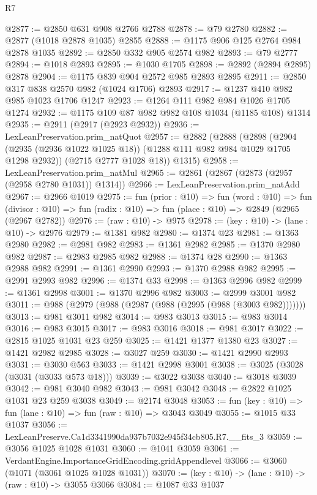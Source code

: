 \begin{lexlean}{R7}
\begin{coremodule}
@2877 := @2850 @631 @908 @2766 @2788
@2878 := @79 @2780
@2882 := @2877 (@1018 @2878 @1035) @2855
@2888 := @1175 @906 @125 @2764 @984 @2878 @1035
@2892 := @2850 @332 @905 @2574 @982
@2893 := @79 @2777
@2894 := @1018 @2893
@2895 := @1030 @1705
@2898 := @2892 (@2894 @2895) @2878
@2904 := @1175 @839 @904 @2572 @985 @2893 @2895
@2911 := @2850 @317 @838 @2570 @982 (@1024 @1706) @2893
@2917 := @1237 @410 @982 @985 @1023 @1706 @1247
@2923 := @1264 @111 @982 @984 @1026 @1705 @1274
@2932 := @1175 @109 @87 @982 @982 @108 @1034 (@1185 @108) @1314
@2935 := @2911 (@2917 (@2923 @2932))
@2936 := LexLeanPreservation.prim_natQuot
@2957 := @2882
    (@2888
      (@2898
        (@2904 (@2935 (@2936 @1022 @1025 @18)) (@1288 @111 @982 @984 @1029 @1705 @1298 @2932))
        (@2715 @2777 @1028 @18))
      @1315)
@2958 := LexLeanPreservation.prim_natMul
@2965 := @2861 (@2867 (@2873 (@2957 (@2958 @2780 @1031)) @1314))
@2966 := LexLeanPreservation.prim_natAdd
@2967 := @2966 @1019
@2975 := fun (prior : @10) =>
  fun (word : @10) =>
  fun (divisor : @10) => fun (radix : @10) => fun (place : @10) => @2849 (@2965 (@2967 @2782))
@2976 := (raw : @10) -> @975
@2978 := (key : @10) -> (lane : @10) -> @2976
@2979 := @1381 @982
@2980 := @1374 @23
@2981 := @1363 @2980
@2982 := @2981 @982
@2983 := @1361 @2982
@2985 := @1370 @2980 @982
@2987 := @2983 @2985 @982
@2988 := @1374 @28
@2990 := @1363 @2988 @982
@2991 := @1361 @2990
@2993 := @1370 @2988 @982
@2995 := @2991 @2993 @982
@2996 := @1374 @33
@2998 := @1363 @2996 @982
@2999 := @1361 @2998
@3001 := @1370 @2996 @982
@3003 := @2999 @3001 @982
@3011 := @988 (@2979 (@988 (@2987 (@988 (@2995 (@988 (@3003 @982)))))))
@3013 := @981 @3011 @982
@3014 := @983 @3013
@3015 := @983 @3014
@3016 := @983 @3015
@3017 := @983 @3016
@3018 := @981 @3017
@3022 := @2815 @1025 @1031 @23 @259
@3025 := @1421 @1377 @1380 @23
@3027 := @1421 @2982 @2985
@3028 := @3027 @259
@3030 := @1421 @2990 @2993
@3031 := @3030 @563
@3033 := @1421 @2998 @3001
@3038 := @3025 (@3028 (@3031 (@3033 @573 @18)))
@3039 := @3022 @3038
@3040 := @3018 @3039
@3042 := @981 @3040 @982
@3043 := @981 @3042
@3048 := @2822 @1025 @1031 @23 @259 @3038
@3049 := @2174 @3048
@3053 := fun (key : @10) => fun (lane : @10) => fun (raw : @10) => @3043 @3049
@3055 := @1015 @33 @1037
@3056 := LexLeanPreserve.Ca1d3341990da937b7032e945f34cb805.R7.__fits_3
@3059 := @3056 @1025 @1028 @1031
@3060 := @1041 @3059
@3061 := VerdantEngine.ImportanceGridEncoding.gridAppendlevel
@3066 := @3060 (@1071 (@3061 @1025 @1028 @1031))
@3070 := (key : @10) -> (lane : @10) -> (raw : @10) -> @3055 @3066
@3084 := @1087
    @33
    @1037

\end{coremodule}
\end{lexlean}
